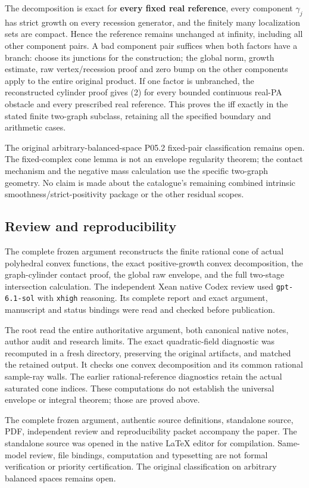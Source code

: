\documentclass[
  11pt,
]{article}
\begin{document}
The decomposition is exact for \textbf{every fixed real reference},
every component \(\gamma_j\) has strict growth on every recession
generator, and the finitely many localization sets are compact. Hence
the reference remains unchanged at infinity, including all other
component pairs. A bad component pair suffices when both factors have a
branch: choose its junctions for the construction; the global norm,
growth estimate, raw vertex/recession proof and zero bump on the other
components apply to the entire original product. If one factor is
unbranched, the reconstructed cylinder proof gives (2) for every bounded
continuous real-PA obstacle and every prescribed real reference. This
proves the iff exactly in the stated finite two-graph subclass,
retaining all the specified boundary and arithmetic cases.

The original arbitrary-balanced-space P05.2 fixed-pair classification
remains open. The fixed-complex cone lemma is not an envelope regularity
theorem; the contact mechanism and the negative mass calculation use the
specific two-graph geometry. No claim is made about the catalogue's
remaining combined intrinsic smoothness/strict-positivity package or the
other residual scopes.

\subsection{Review and reproducibility}

The complete frozen argument reconstructs the finite rational cone of
actual polyhedral convex functions, the exact positive-growth convex
decomposition, the graph-cylinder contact proof, the global raw envelope,
and the full two-stage intersection calculation. The independent Xean
native Codex review used \texttt{gpt-6.1-sol} with \texttt{xhigh}
reasoning. Its complete report and exact argument, manuscript and status
bindings were read and checked before publication.

The root read the entire authoritative argument, both canonical native
notes, author audit and research limits. The exact quadratic-field
diagnostic was recomputed in a fresh directory, preserving the original
artifacts, and matched the retained output. It checks one convex
decomposition and its common rational sample-ray walls. The earlier
rational-reference diagnostics retain the actual saturated cone indices.
These computations do not establish the universal envelope or integral
theorem; those are proved above.

The complete frozen argument, authentic source definitions, standalone
source, PDF, independent review and reproducibility packet accompany the
paper. The standalone source was opened in the native LaTeX editor for
compilation. Same-model review, file bindings, computation and typesetting
are not formal verification or priority certification. The original
classification on arbitrary balanced spaces remains open.
\end{document}
